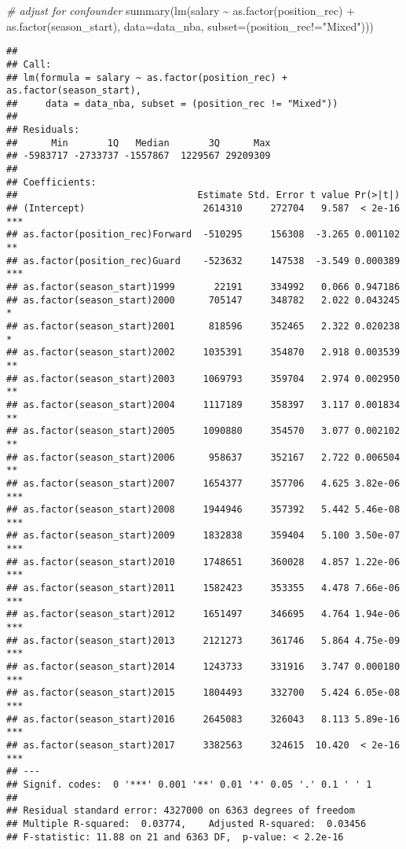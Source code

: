 \documentclass[
]{book}
\newenvironment{Shaded}{\begin{snugshade}}{\end{snugshade}}
\newcommand{\AttributeTok}[1]{\textcolor[rgb]{0.77,0.63,0.00}{#1}}
\newcommand{\AttributeTok}[1]{\textcolor[rgb]{0.13,0.29,0.53}{#1}}
\newcommand{\CommentTok}[1]{\textcolor[rgb]{0.56,0.35,0.01}{\textit{#1}}}
\newcommand{\FunctionTok}[1]{\textcolor[rgb]{0.00,0.00,0.00}{#1}}
\newcommand{\FunctionTok}[1]{\textcolor[rgb]{0.13,0.29,0.53}{\textbf{#1}}}
\newcommand{\NormalTok}[1]{#1}
\newcommand{\SpecialCharTok}[1]{\textcolor[rgb]{0.00,0.00,0.00}{#1}}
\newcommand{\SpecialCharTok}[1]{\textcolor[rgb]{0.81,0.36,0.00}{\textbf{#1}}}
\newcommand{\StringTok}[1]{\textcolor[rgb]{0.31,0.60,0.02}{#1}}
\begin{document}
\begin{Shaded}
\begin{Highlighting}[]
\CommentTok{\# adjust for confounder }
\FunctionTok{summary}\NormalTok{(}\FunctionTok{lm}\NormalTok{(salary }\SpecialCharTok{\textasciitilde{}} \FunctionTok{as.factor}\NormalTok{(position\_rec) }\SpecialCharTok{+} \FunctionTok{as.factor}\NormalTok{(season\_start), }\AttributeTok{data=}\NormalTok{data\_nba, }\AttributeTok{subset=}\NormalTok{(position\_rec}\SpecialCharTok{!=}\StringTok{"Mixed"}\NormalTok{)))}
\end{Highlighting}
\end{Shaded}

\begin{verbatim}
## 
## Call:
## lm(formula = salary ~ as.factor(position_rec) + as.factor(season_start), 
##     data = data_nba, subset = (position_rec != "Mixed"))
## 
## Residuals:
##      Min       1Q   Median       3Q      Max 
## -5983717 -2733737 -1557867  1229567 29209309 
## 
## Coefficients:
##                                Estimate Std. Error t value Pr(>|t|)    
## (Intercept)                     2614310     272704   9.587  < 2e-16 ***
## as.factor(position_rec)Forward  -510295     156308  -3.265 0.001102 ** 
## as.factor(position_rec)Guard    -523632     147538  -3.549 0.000389 ***
## as.factor(season_start)1999       22191     334992   0.066 0.947186    
## as.factor(season_start)2000      705147     348782   2.022 0.043245 *  
## as.factor(season_start)2001      818596     352465   2.322 0.020238 *  
## as.factor(season_start)2002     1035391     354870   2.918 0.003539 ** 
## as.factor(season_start)2003     1069793     359704   2.974 0.002950 ** 
## as.factor(season_start)2004     1117189     358397   3.117 0.001834 ** 
## as.factor(season_start)2005     1090880     354570   3.077 0.002102 ** 
## as.factor(season_start)2006      958637     352167   2.722 0.006504 ** 
## as.factor(season_start)2007     1654377     357706   4.625 3.82e-06 ***
## as.factor(season_start)2008     1944946     357392   5.442 5.46e-08 ***
## as.factor(season_start)2009     1832838     359404   5.100 3.50e-07 ***
## as.factor(season_start)2010     1748651     360028   4.857 1.22e-06 ***
## as.factor(season_start)2011     1582423     353355   4.478 7.66e-06 ***
## as.factor(season_start)2012     1651497     346695   4.764 1.94e-06 ***
## as.factor(season_start)2013     2121273     361746   5.864 4.75e-09 ***
## as.factor(season_start)2014     1243733     331916   3.747 0.000180 ***
## as.factor(season_start)2015     1804493     332700   5.424 6.05e-08 ***
## as.factor(season_start)2016     2645083     326043   8.113 5.89e-16 ***
## as.factor(season_start)2017     3382563     324615  10.420  < 2e-16 ***
## ---
## Signif. codes:  0 '***' 0.001 '**' 0.01 '*' 0.05 '.' 0.1 ' ' 1
## 
## Residual standard error: 4327000 on 6363 degrees of freedom
## Multiple R-squared:  0.03774,    Adjusted R-squared:  0.03456 
## F-statistic: 11.88 on 21 and 6363 DF,  p-value: < 2.2e-16
\end{verbatim}
\end{document}
